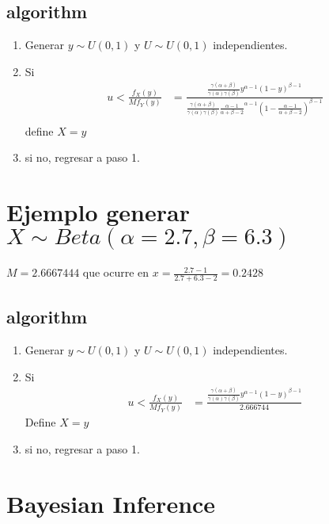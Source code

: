 \documentclass[10pt, oneside]{article}
\begin{document}
\subsection{algorithm}

\begin{enumerate}
	\item Generar $y \sim U(0,1)$ y $U \sim U(0,1)$ independientes.
	\item Si
	      \[
		      \begin{split}
			      u < \frac{f_X(y)}{M f_Y(y)} & = \frac{\frac{\gamma(\alpha + \beta)}{\gamma(\alpha)\gamma(\beta)}y^{\alpha - 1}(1-y)^{\beta-1}}
			      {\frac{\gamma(\alpha + \beta)}{\gamma(\alpha)\gamma(\beta)} \frac{\alpha - 1}{\alpha + \beta - 2}^{\alpha - 1}(1-\frac{\alpha - 1}{\alpha + \beta - 2})^{\beta-1}} \\
		      \end{split}
	      \]
	      define $X=y$
	\item si no, regresar a paso 1.
\end{enumerate}

\section{Ejemplo generar $X \sim Beta( \alpha=2.7, \beta=6.3)$}

$M= 2.6667444$  que ocurre en $x = \frac{2.7 - 1}{2.7 + 6.3 - 2} = 0.2428$

\subsection{algorithm}

\begin{enumerate}
	\item Generar $y \sim U(0,1)$ y $U \sim U(0,1)$ independientes.
	\item Si
	      \[
		      \begin{split}
			      u < \frac{f_X(y)}{M f_Y(y)} & = \frac{\frac{\gamma(\alpha + \beta)}{\gamma(\alpha)\gamma(\beta)}y^{\alpha - 1}(1-y)^{\beta-1}}
			      {2.666744}
		      \end{split}
	      \]
	      Define $X=y$
	\item si no, regresar a paso 1.
\end{enumerate}


\section{Bayesian Inference}
\end{document}
